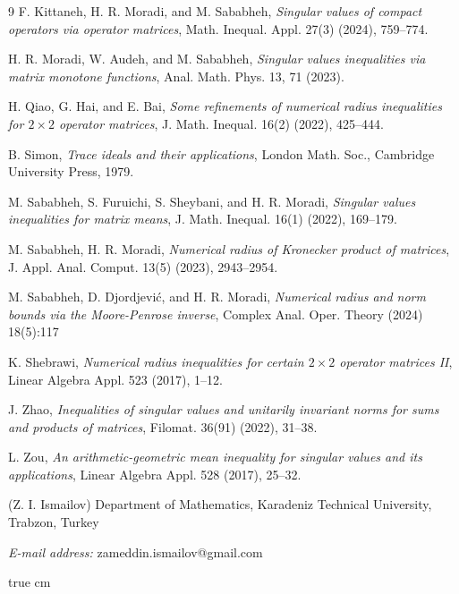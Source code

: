 \documentclass[12pt,twoside,reqno]{amsart}
\numberwithin{equation}{section}
\begin{document}
\begin{thebibliography}{9}
F. Kittaneh, H. R. Moradi, and M. Sababheh, {\it Singular values of compact operators via operator matrices}, Math. Inequal. Appl. 27(3) (2024), 759--774.

H. R. Moradi, W. Audeh, and M. Sababheh, {\it Singular values inequalities via matrix monotone functions}, Anal. Math. Phys. 13, 71 (2023).

H. Qiao, G. Hai, and E. Bai, {\it Some refinements of numerical radius inequalities for $2\times 2$ operator matrices}, J. Math. Inequal. {16}(2) (2022), 425--444.

B. Simon, {\it Trace ideals and their applications}, London Math. Soc., Cambridge University Press, 1979.	

M. Sababheh, S. Furuichi, S. Sheybani, and H. R. Moradi,  {\it Singular values inequalities for matrix means}, J.  Math. Inequal. {16}(1) (2022), 169--179.

M. Sababheh, H. R. Moradi, {\it Numerical radius of Kronecker product of matrices}, J. Appl. Anal. Comput. 13(5) (2023), 2943--2954.

M. Sababheh, D. Djordjevi\'c, and H. R. Moradi, {\it Numerical radius and norm bounds via the Moore-Penrose inverse}, Complex Anal. Oper. Theory (2024) 18(5):117

K. Shebrawi, {\it Numerical radius inequalities for certain $2\times 2$ operator matrices II}, Linear Algebra Appl. 523 (2017), 1--12.

J. Zhao, {\it Inequalities of singular values and unitarily invariant norms for sums and products of matrices}, Filomat. {36}(91) (2022), 31--38.

L. Zou, {\it An arithmetic-geometric mean inequality for singular values and its applications}, Linear Algebra Appl. 528 (2017), 25--32.
\end{thebibliography}

\vspace{.25in}

{\tiny (Z. I. Ismailov) Department of Mathematics, Karadeniz Technical University, Trabzon, Turkey}

{\tiny \textit{E-mail address:} zameddin.ismailov@gmail.com}



 true cm 	
\end{document}

